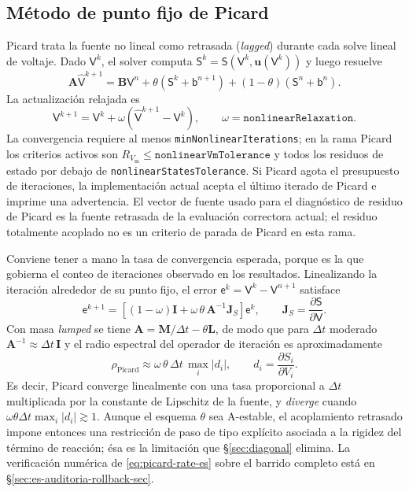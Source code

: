 \documentclass[11pt,a4paper]{article}
\newcommand{\code}[1]{\texttt{\small #1}}
\newcommand{\Vm}{V_{\text{m}}}
\newcommand{\Mmass}{\mathbf{M}}
\newcommand{\Lop}{\mathbf{L}}
\newcommand{\Aimp}{\mathbf{A}}
\newcommand{\Bimp}{\mathbf{B}}
\begin{document}
\subsection{Método de punto fijo de Picard}
\label{sec:picard}

Picard trata la fuente no lineal como retrasada (\emph{lagged}) durante cada solve lineal de
voltaje. Dado $\mathsf{V}^{k}$, el solver computa
$\mathsf{S}^{k}=\mathsf{S}(\mathsf{V}^{k},\mathbf{u}(\mathsf{V}^{k}))$ y luego resuelve
\begin{equation}
  \Aimp \widehat{\mathsf{V}}^{k+1}
  =
  \Bimp\mathsf{V}^{n}
  +\theta(\mathsf{S}^{k}+\mathsf{b}^{n+1})
  +(1-\theta)(\mathsf{S}^{n}+\mathsf{b}^{n}).
\end{equation}
La actualización relajada es
\begin{equation}
  \mathsf{V}^{k+1}
  =
  \mathsf{V}^{k}
  +
  \omega\left(\widehat{\mathsf{V}}^{k+1}-\mathsf{V}^{k}\right),
  \qquad
  \omega=\texttt{nonlinearRelaxation}.
\end{equation}
La convergencia requiere al menos \code{minNonlinearIterations}; en la rama Picard los
criterios activos son $R_{\Vm}\le\texttt{nonlinearVmTolerance}$ y todos los residuos de
estado por debajo de \code{nonlinearStatesTolerance}. Si Picard agota el presupuesto de
iteraciones, la implementación actual acepta el último iterado de Picard e imprime una
advertencia. El vector de fuente usado para el diagnóstico de
residuo de Picard es la fuente retrasada de la evaluación correctora actual; el residuo
totalmente acoplado no es un criterio de parada de Picard en esta rama.

Conviene tener a mano la tasa de convergencia esperada, porque es la que gobierna el conteo de
iteraciones observado en los resultados. Linealizando la iteración alrededor de su punto fijo,
el error $\mathsf{e}^k=\mathsf{V}^k-\mathsf{V}^{n+1}$ satisface
\begin{equation}
  \mathsf{e}^{k+1}
  =
  \left[(1-\omega)\mathbf{I}+\omega\,\theta\,\Aimp^{-1}\mathbf{J}_S\right]\mathsf{e}^{k},
  \qquad
  \mathbf{J}_S=\frac{\partial\mathsf{S}}{\partial\mathsf{V}} .
\end{equation}
Con masa \emph{lumped} se tiene $\Aimp=\Mmass/\Delta t-\theta\Lop$, de modo que para $\Delta t$
moderado $\Aimp^{-1}\approx\Delta t\,\mathbf{I}$ y el radio espectral del operador de iteración
es aproximadamente
\begin{equation}
  \rho_{\text{Picard}}
  \approx
  \omega\,\theta\,\Delta t\,\max_i\left|d_i\right|,
  \qquad
  d_i=\frac{\partial S_i}{\partial V_i}.
  \label{eq:picard-rate-es}
\end{equation}
Es decir, Picard converge linealmente con una tasa proporcional a $\Delta t$ multiplicada por
la constante de Lipschitz de la fuente, y \emph{diverge} cuando
$\omega\theta\Delta t\max_i|d_i|\gtrsim1$. Aunque el esquema $\theta$ sea A-estable, el
acoplamiento retrasado impone entonces una restricción de paso de tipo explícito asociada a la
rigidez del término de reacción; ésa es la limitación que \S\ref{sec:diagonal} elimina. La
verificación numérica de \eqref{eq:picard-rate-es} sobre el barrido completo está en
\S\ref{sec:es-auditoria-rollback-sec}.
\end{document}
